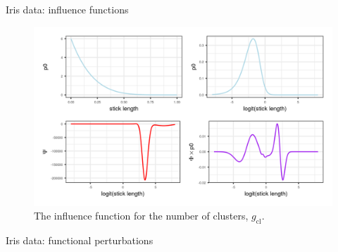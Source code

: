 \begin{frame}{Iris data: influence functions}
  \begin{figure}[!h]
    \centering
    \includegraphics[width = \textwidth]{./figures/iris_influence_function.png}
    \caption*{The influence function for the number of clusters, $g_{\textrm{cl}}$.}
\end{figure}
\end{frame}

\begin{frame}{Iris data: functional perturbations}
\begin{figure}[!h]
    \centering
\end{figure}
\end{frame}

